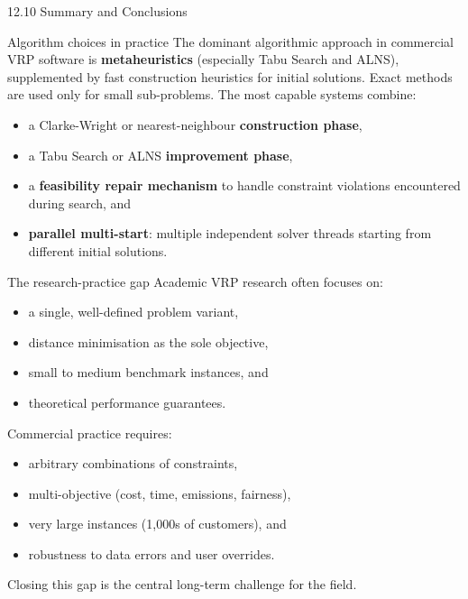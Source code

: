 \documentclass[aspectratio=169,10pt]{beamer}
\begin{document}
\begin{frame}[allowframebreaks]{12.10 \; Summary and Conclusions}
  \begin{block}{Algorithm choices in practice}
    The dominant algorithmic approach in commercial VRP software is
    \textbf{metaheuristics} (especially Tabu Search and ALNS),
    supplemented by fast construction heuristics for initial solutions.
    Exact methods are used only for small sub-problems.
    The most capable systems combine:
    \begin{itemize}
      \item a Clarke-Wright or nearest-neighbour \textbf{construction phase},
      \item a Tabu Search or ALNS \textbf{improvement phase},
      \item a \textbf{feasibility repair mechanism} to handle
            constraint violations encountered during search, and
      \item \textbf{parallel multi-start}: multiple independent solver
            threads starting from different initial solutions.
    \end{itemize}
  \end{block}

  \begin{block}{The research-practice gap}
    Academic VRP research often focuses on:
    \begin{itemize}
      \item a single, well-defined problem variant,
      \item distance minimisation as the sole objective,
      \item small to medium benchmark instances, and
      \item theoretical performance guarantees.
    \end{itemize}
    Commercial practice requires:
    \begin{itemize}
      \item arbitrary combinations of constraints,
      \item multi-objective (cost, time, emissions, fairness),
      \item very large instances (1,000s of customers), and
      \item robustness to data errors and user overrides.
    \end{itemize}
    Closing this gap is the central long-term challenge for the field.
  \end{block}

  \framebreak


\end{frame}
\end{document}
